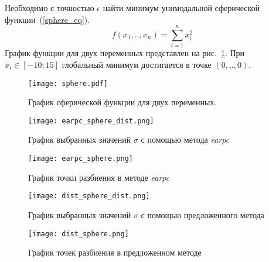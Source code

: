 Необходимо с точностью $\epsilon$ найти минимум унимодальной сферической функции~(\ref{sphere_eq}).
\begin{equation}
\label{sphere_eq}
f(x_1,..,x_n) = \sum\limits_{i=1}^n{x_i^2}
\end{equation}
График функции для двух переменных представлен на рис.~\ref{sphere_plot}. При $x_i \in [-10; 15]$ глобальный минимум достигается в точке $(0,..,0)$.

\begin{figure}
    \centering
    \texttt{[image: sphere.pdf]}
    \caption{График сферической функции для двух переменных.}
    \label{sphere_plot}
\end{figure}

\begin{figure}
    \centering
    \label{earpc_sphere_dist}
    \texttt{[image: earpc\_sphere\_dist.png]}
    \caption{График выбранных значений $\sigma$ с помощью метода \textit{earpc}}
\end{figure}


\begin{figure}
\label{earpc_sphere}
    \centering
    \texttt{[image: earpc\_sphere.png]}
    \caption{График точки разбиения в методе \textit{earpc}}
\end{figure}

\begin{figure}
\label{dist_sphere}
    \centering
    \texttt{[image: dist\_sphere\_dist.png]}
    \caption{График выбранных значений $\sigma$ с помощью предложенного метода}
\end{figure}

\begin{figure}
    \centering
    \texttt{[image: dist\_sphere.png]}
    \caption{График точек разбиения в предложенном методе}
\end{figure}


